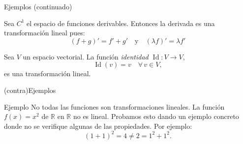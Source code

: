 \documentclass[handout]{beamer} %
\newcommand{\Id}{\operatorname{Id}}
\newcommand{\R}{\mathbb R}
\begin{document}
\begin{frame}{Ejemplos (continuado)}

    \begin{ejemplo}

Sea $C^1$ el espacio de funciones derivables. Entonces la derivada es una transformación lineal pues:
$$
(f+g)'=f'+g'\quad\mbox{y}\quad
(\lambda f)'=\lambda f'
$$

\end{ejemplo}

\pause

\begin{ejemplo}

Sea $V$ un espacio vectorial. La función \textit{identidad $\Id:V\longrightarrow V$},
$$
\Id(v)=v\quad\forall\, v\in V,
$$
es una transformación lineal. 
\end{ejemplo}
\end{frame}


\begin{frame}{(contra)Ejemplos}
\begin{exampleblock}{Ejemplo}
No todas las funciones son transformaciones lineales. La función $f(x)=x^2$ de $\R$ en $\R$ no es lineal. Probamos esto dando un ejemplo concreto donde no se verifique algunas de las propiedades. Por ejemplo:
$$
(1+1)^2=4\neq2= 1^2+1^2.
$$


\end{exampleblock}
 \vskip 3cm
\end{frame}

\end{document}
